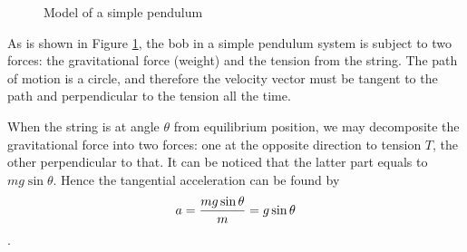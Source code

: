 \documentclass[a4paper]{article}
\begin{document}
\begin{figure}[ht]
    \centering
    \caption{Model of a simple pendulum}
    \label{figp}
\end{figure}

As is shown in Figure \ref{figp}, the bob in a simple pendulum system is subject to two forces: the gravitational force (weight) and the tension from the string. The path of motion is a circle, and therefore the velocity vector must be tangent to the path and perpendicular to the tension all the time. 

When the string is at angle $\theta$ from equilibrium position, we may decomposite the gravitational force into two forces: one at the opposite direction to tension $T$, the other perpendicular to that. It can be noticed that the latter part equals to $mg\sin\theta$. Hence the tangential acceleration can be found by $$a = {mg\sin\theta\over m} = g\sin\theta$$.
\end{document}
